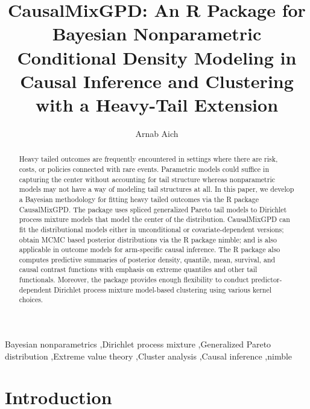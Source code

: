\documentclass[preprint,12pt,authoryear]{elsarticle}
\newcommand{\pkg}[1]{\textsf{#1}}
\newcommand{\proglang}[1]{\textsf{#1}}
\begin{document}
\begin{frontmatter}

\title{\pkg{CausalMixGPD}: An \proglang{R} Package for Bayesian Nonparametric Conditional Density Modeling in Causal Inference and Clustering with a Heavy-Tail Extension}

\author[fsu]{Arnab Aich}


\begin{abstract}
Heavy tailed outcomes are frequently encountered in settings where there are risk, costs, or policies connected with rare events. Parametric models could suffice in capturing the center without accounting for tail structure whereas nonparametric models may not have a way of modeling tail structures at all. In this paper, we develop a Bayesian methodology for fitting heavy tailed outcomes via the R package \pkg{CausalMixGPD}. The package uses spliced generalized Pareto tail models to Dirichlet process mixture models that model the center of the distribution. \pkg{CausalMixGPD} can fit the distributional models either in unconditional or covariate-dependent versions; obtain MCMC based posterior distributions via the R package \pkg{nimble}; and is also applicable in outcome models for arm-specific causal inference. The R package also computes predictive summaries of posterior density, quantile, mean, survival, and causal contrast functions with emphasis on extreme quantiles and other tail functionals. Moreover, the package provides enough flexibility to conduct predictor-dependent Dirichlet process mixture model-based clustering using various kernel choices.
\end{abstract}

\begin{keyword}
Bayesian nonparametrics \sep Dirichlet process mixture \sep Generalized Pareto distribution \sep Extreme value theory \sep Cluster analysis \sep Causal inference \sep \pkg{nimble}
\end{keyword}

\end{frontmatter}
\section{Introduction}
\end{document}
